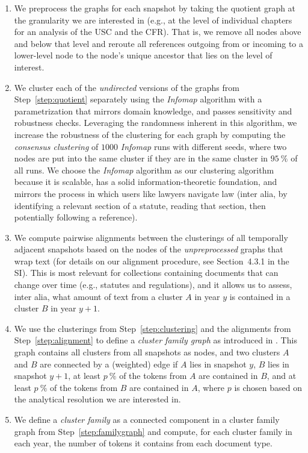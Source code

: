 \documentclass[utf8,sort&compress,table,hidelinks]{frontiersFPHY} %
\newcommand{\thesi}{SI\xspace}
\begin{document}
\begin{enumerate}
	\item We preprocess the graphs for each snapshot by taking the quotient graph at the granularity we are interested in (e.g., at the level of individual chapters for an analysis of the USC and the CFR).
	That is, we remove all nodes above and below that level and reroute all references outgoing from or incoming to a lower-level node to the node's unique ancestor that lies on the level of interest.\label{step:quotient} 
	\item We cluster each of the \emph{undirected} versions of the graphs from Step~\ref{step:quotient} separately using the \emph{Infomap} algorithm \cite{rosvall2008,rosvall2009} with a parametrization that mirrors domain knowledge, and passes sensitivity and robustness checks. 
	Leveraging the randomness inherent in this algorithm, we increase the robustness of the clustering for each graph by computing the \emph{consensus clustering} \cite{lancichinetti2012} of $1000$ \emph{Infomap} runs with different seeds, where two nodes are put into the same cluster if they are in the same cluster in $95~\%$ of all runs.
	We choose the \emph{Infomap} algorithm as our clustering algorithm because it is scalable, has a solid information-theoretic foundation, and mirrors the process in which users like lawyers navigate law (inter alia, by identifying a relevant section of a statute, reading that section, then potentially following a reference).\label{step:clustering} 
	\item We compute pairwise alignments between the clusterings of all temporally adjacent snapshots based on the nodes of the \emph{unpreprocessed} graphs that wrap text (for details on our alignment procedure, see Section~4.3.1 in the \thesi).
	This is most relevant for collections containing documents that can change over time (e.g., statutes and regulations), and it allows us to assess, inter alia, what amount of text from a cluster $A$ in year $y$ is contained in a cluster $B$ in year $y+1$.\label{step:alignment}   
	\item We use the clusterings from Step~\ref{step:clustering} and the alignments from Step~\ref{step:alignment} to define a \emph{cluster family graph} as introduced in \cite{katz2020}. 
	This graph contains all clusters from all snapshots as nodes, and two clusters $A$ and $B$ are connected by a (weighted) edge if $A$ lies in snapshot $y$, $B$ lies in snapshot $y+1$, at least $p~\%$ of the tokens from $A$ are contained in $B$, and at least $p~\%$ of the tokens from $B$ are contained in $A$, where $p$ is chosen based on the analytical resolution we are interested in.\label{step:familygraph}
	\item We define a \emph{cluster family} as a connected component in a cluster family graph from Step~\ref{step:familygraph} and compute, for each cluster family in each year, the number of tokens it contains from each document type.\label{step:family}
\end{enumerate}
\end{document}
